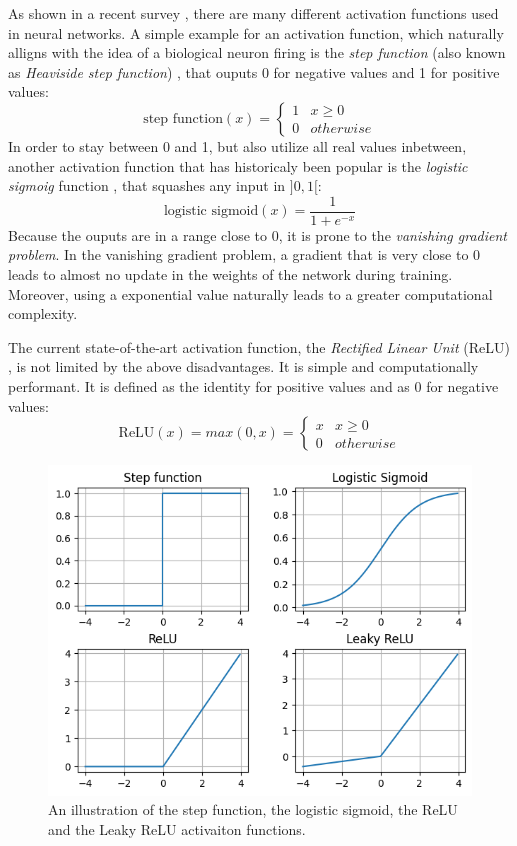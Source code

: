 As shown in a recent survey \cite{activation_functions}, there are many different activation functions used in neural networks. A simple example for an activation function, which naturally alligns with the idea of a biological neuron firing is the \textit{step function} (also known as \textit{Heaviside step function}) \cite{neural_networks_pattern_recognition}, that ouputs 0 for negative values and 1 for positive values:
$$\text{step function}(x) = 
\begin{cases}
    1 & x \geq 0\\
    0 & otherwise
\end{cases}
$$
In order to stay between 0 and 1, but also utilize all real values inbetween, another activation function that has historicaly been popular is the \textit{logistic sigmoig} function \cite{activation_functions}, that squashes any input in $]0, 1[$:
$$\text{logistic sigmoid}(x) = \frac{1}{1 + e^{-x}}$$
Because the ouputs are in a range close to 0, it is prone to the \textit{vanishing gradient problem}. In the vanishing gradient problem, a gradient that is very close to 0 leads to almost no update in the weights of the network during training. Moreover, using a exponential value naturally leads to a greater computational complexity. \cite{activation_functions}

The current state-of-the-art activation function, the \textit{Rectified Linear Unit} (ReLU) \cite{activation_functions}, is not limited by the above disadvantages. It is simple and computationally performant. It is defined as the identity for positive values and as 0 for negative values:
$$\text{ReLU}(x) = max(0, x) = 
\begin{cases}
    x & x \geq 0\\
    0 & otherwise
\end{cases}
$$

\begin{figure}
	\includegraphics[width=\linewidth]{activation-functions.png}
	\caption{An illustration of the step function, the logistic sigmoid, the ReLU and the Leaky ReLU activaiton functions.}
	\label{activation_functions}
\end{figure}



